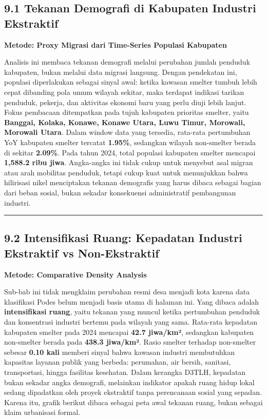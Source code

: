\documentclass[
]{article}
\begin{document}
\subsection{9.1 Tekanan Demografi di Kabupaten Industri
Ekstraktif}\label{tekanan-demografi-di-kabupaten-industri-ekstraktif}

\textbf{Metode: Proxy Migrasi dari Time-Series Populasi Kabupaten}

Analisis ini membaca tekanan demografi melalui perubahan jumlah penduduk
kabupaten, bukan melalui data migrasi langsung. Dengan pendekatan ini,
populasi diperlakukan sebagai sinyal awal: ketika kawasan smelter tumbuh
lebih cepat dibanding pola umum wilayah sekitar, maka terdapat indikasi
tarikan penduduk, pekerja, dan aktivitas ekonomi baru yang perlu diuji
lebih lanjut. Fokus pembacaan ditempatkan pada tujuh kabupaten prioritas
smelter, yaitu \textbf{Banggai, Kolaka, Konawe, Konawe Utara, Luwu
Timur, Morowali, Morowali Utara}. Dalam window data yang tersedia,
rata-rata pertumbuhan YoY kabupaten smelter tercatat \textbf{1.95\%},
sedangkan wilayah non-smelter berada di sekitar \textbf{2.09\%}. Pada
tahun 2024, total populasi kabupaten smelter mencapai \textbf{1,588.2
ribu jiwa}. Angka-angka ini tidak cukup untuk menyebut asal migran atau
arah mobilitas penduduk, tetapi cukup kuat untuk menunjukkan bahwa
hilirisasi nikel menciptakan tekanan demografis yang harus dibaca
sebagai bagian dari beban sosial, bukan sekadar konsekuensi
administratif pembangunan industri.

\begin{center}\rule{0.5\linewidth}{0.5pt}\end{center}

\subsection{9.2 Intensifikasi Ruang: Kepadatan Industri Ekstraktif vs
Non-Ekstraktif}\label{intensifikasi-ruang-kepadatan-industri-ekstraktif-vs-non-ekstraktif}

\textbf{Metode: Comparative Density Analysis}

Sub-bab ini tidak mengklaim perubahan resmi desa menjadi kota karena
data klasifikasi Podes belum menjadi basis utama di halaman ini. Yang
dibaca adalah \textbf{intensifikasi ruang}, yaitu tekanan yang muncul
ketika pertumbuhan penduduk dan konsentrasi industri bertemu pada
wilayah yang sama. Rata-rata kepadatan kabupaten smelter pada 2024
mencapai \textbf{42.7 jiwa/km²}, sedangkan kabupaten non-smelter berada
pada \textbf{438.3 jiwa/km²}. Rasio smelter terhadap non-smelter sebesar
\textbf{0.10 kali} memberi sinyal bahwa kawasan industri membutuhkan
kapasitas layanan publik yang berbeda: perumahan, air bersih, sanitasi,
transportasi, hingga fasilitas kesehatan. Dalam kerangka D3TLH,
kepadatan bukan sekadar angka demografi, melainkan indikator apakah
ruang hidup lokal sedang dipadatkan oleh proyek ekstraktif tanpa
perencanaan sosial yang sepadan. Karena itu, grafik berikut dibaca
sebagai peta awal tekanan ruang, bukan sebagai klaim urbanisasi formal.
\end{document}
